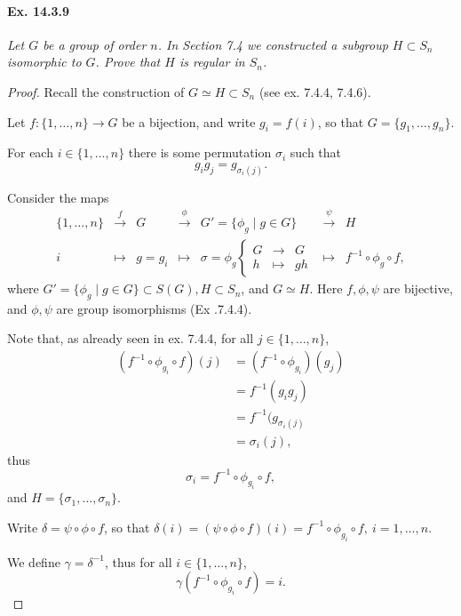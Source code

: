 \documentclass[11pt,a4paper]{article}
\begin{document}
  \paragraph{Ex. 14.3.9}{\it Let $G$ be a group of order $n$. In Section 7.4 we constructed a subgroup $H \subset S_n$ isomorphic to $G$. Prove that $H$ is regular in $S_n$.
  }
  \begin{proof}
  Recall the construction of $G \simeq H \subset S_n$ (see ex. 7.4.4, 7.4.6).
  
  Let $f : \{1,\ldots,n\} \to G$ be a bijection, and write $g_i = f(i)$, so that $G = \{g_1,\ldots,g_n\}$.
  
  For each $i \in \{1,\ldots,n\}$ there is some permutation $\sigma_i$ such that $$g_i g_j = g_{\sigma_i(j)}.$$
  
  Consider the maps
  $$
  \begin{array}{cclllll}
  \{1,\ldots,n\} & \overset{f}{\to}  & G                          &\overset{\phi}{\to}               & G'=\{\phi_g \mid g \in G \}       & \overset{\psi} {\to}     & H\\
  i                   & \mapsto            & g = g_i                  &\mapsto                             &\sigma = \phi_g 
  \left\{
  \begin{array}{ccc}
  G & \to &G\\
  h & \mapsto & gh
  \end{array}
  \right.
                        & \mapsto                       &  f^{-1}\circ \phi_g \circ f,
  \end{array}
  $$
where $G' = \{\phi_g \mid g\in G \} \subset S(G), H \subset S_n$, and $G \simeq H$. Here $f,\phi,\psi$ are bijective, and $\phi,\psi$ are group isomorphisms (Ex .7.4.4).

Note that, as already seen in ex. 7.4.4, for all $j\in \{1,\ldots,n\}$,
\begin{align*}
(f^{-1} \circ \phi_{g_i} \circ f)(j) &= (f^{-1} \circ \phi_{g_i})(g_j)\\
&= f^{-1}(g_i g_j)\\
&= f^{-1}(g_{\sigma_i(j)}\\
&= \sigma_i(j),
\end{align*}
thus
$$\sigma_i = f^{-1} \circ \phi_{g_i} \circ f,$$
and $H = \{\sigma_1,\ldots,\sigma_n\}$.

Write $\delta = \psi \circ \phi \circ f$, so that $\delta(i) = ( \psi \circ \phi \circ f)(i)  =f^{-1} \circ \phi_{g_i} \circ f,\ i=1,\ldots,n.$

We define $\gamma = \delta^{-1}$, thus for all $i \in \{1,\ldots,n\}$, 
$$\gamma(f^{-1} \circ \phi_{g_i} \circ f) = i.$$


\end{proof}
\end{document}
